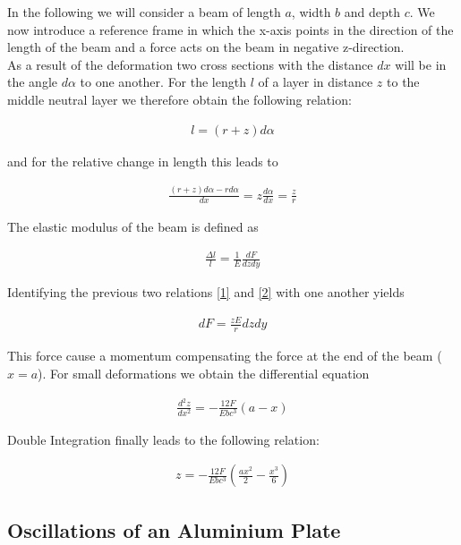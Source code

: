 In the following we will consider a beam of length $a$, width $b$ and depth $c$. We now introduce a reference frame in which the x-axis points in the direction of the length of the beam and a force acts on the beam in negative z-direction.\\

As a result of the deformation two cross sections with the distance $dx$ will be in the angle $d\alpha$ to one another. For the length $l$ of a layer in distance $z$ to the middle neutral layer we therefore obtain the following relation:

\begin{align}
l=(r+z)d\alpha
\end{align}


and for the relative change in length this leads to

\begin{align}
\frac{(r+z)d\alpha-r d\alpha}{dx}=z\frac{d\alpha}{dx}=\frac{z}{r} \label{1}
\end{align}


The elastic modulus of the beam is defined as

\begin{align}
\frac{\Delta l}{l}=\frac{1}{E}\frac{dF}{dzdy} \label{2}
\end{align}


Identifying the previous two relations \ref{1} and \ref{2} with one another yields

\begin{align}
dF=\frac{zE}{r}dzdy
\end{align}

This force cause a momentum compensating the force at the end of the beam ( $x=a$). For small deformations we obtain the differential equation

\begin{align}
\frac{d^2z}{dx^2}=-\frac{12F}{Ebc^3}(a-x)
\end{align}

Double Integration finally leads to the following relation:

\begin{align}
z=-\frac{12F}{Ebc^3}\left(\frac{ax^2}{2}-\frac{x^3}{6} \right)
\end{align}


\subsection{Oscillations of an Aluminium Plate}




